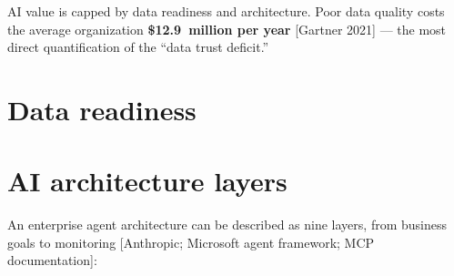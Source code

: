 
AI value is capped by data readiness and architecture. Poor data quality costs
the average organization \textbf{\$12.9~million per year} [Gartner 2021] — the
most direct quantification of the ``data trust deficit.''

\section{Data readiness}

\begin{center}
  \renewcommand{\arraystretch}{1.45}
\end{center}

\section{AI architecture layers}

An enterprise agent architecture can be described as nine layers, from
business goals to monitoring [Anthropic; Microsoft agent framework; MCP
documentation]:


